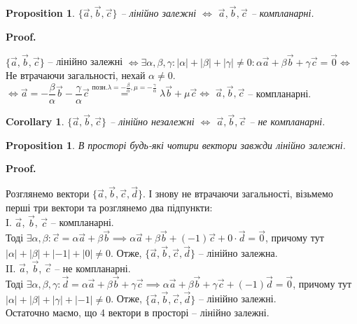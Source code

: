 \documentclass[a4paper, 10pt]{extarticle}
\makeatletter
\def\qed{$\blacksquare$}
\def\qed{$\blacksquare$}
\theoremstyle{theoremdd}
\theoremstyle{theoremdd}
\theoremstyle{theoremdd}
\theoremstyle{theoremdd}
\theoremstyle{theoremdd}
\newtheorem{proposition}[theorem]{Proposition}
\theoremstyle{theoremdd}
\theoremstyle{theoremdd}
\theoremstyle{theoremdd}
\newtheorem{corollary}[theorem]{Corollary}
\renewenvironment{proof}[1][Proof.\\]{\par
\pushQED{\hfill \qed}%
\normalfont \topsep6\p@\@plus6\p@\relax
\trivlist
\item\relax
{\bfseries
#1\@addpunct{.}}\hspace\labelsep\ignorespaces
}{%
\popQED\endtrivlist\@endpefalse
}
\makeatother
\begin{document}
\begin{proposition}
$\{\vec{a},\vec{b},\vec{c} \}$ -- лінійно залежні $\iff$ $\vec{a},\vec{b},\vec{c}$ -- компланарні.
\end{proposition}

\begin{proof}
	$\{\vec{a},\vec{b},\vec{c}\}$ -- лінійно залежні $\iff \exists \alpha, \beta, \gamma: |\alpha| + |\beta| + |\gamma| \neq 0: \alpha \vec{a} + \beta \vec{b} + \gamma \vec{c} = \vec{0} \boxed{\iff}$\\
	Не втрачаючи загальності, нехай $\alpha \neq 0$.\\
$\boxed{\iff} \vec{a} = -\dfrac{\beta}{\alpha} \vec{b} - \dfrac{\gamma}{\alpha} \vec{c} \overset{\textrm{позн.} \lambda = -\frac{\beta}{\alpha}, \mu = -\frac{\gamma}{\alpha}}{=} \lambda \vec{b} + \mu \vec{c} \iff$ $\vec{a},\vec{b},\vec{c}$ -- компланарні.
\end{proof}

\begin{corollary}
	$\{\vec{a},\vec{b},\vec{c}\}$ -- лінійно незалежні $\iff$ $\vec{a},\vec{b},\vec{c}$ -- не компланарні.
\end{corollary}

\begin{proposition}
	В просторі будь-які чотири вектори завжди лінійно залежні.
\end{proposition}

\begin{proof}
	Розглянемо вектори $\{\vec{a},\vec{b},\vec{c},\vec{d}\}$. І знову не втрачаючи загальності, візьмемо перші три вектори та розглянемо два підпункти:\\
	I. $\vec{a}$, $\vec{b}$, $\vec{c}$ -- компланарні.\\
	Тоді $\exists \alpha, \beta: \vec{c} = \alpha \vec{a} + \beta \vec{b} \implies \alpha \vec{a} + \beta \vec{b} + (-1)\vec{c} + 0 \cdot \vec{d} = \vec{0}$, причому тут $|\alpha| + |\beta| + |-1| + |0| \neq 0$. Отже, $\{\vec{a}, \vec{b}, \vec{c}, \vec{d}\}$ -- лінійно залежна.
	\bigskip \\
	II. $\vec{a}$, $\vec{b}$, $\vec{c}$ -- не компланарні.\\
	Тоді $\exists \alpha, \beta, \gamma: \vec{d} = \alpha \vec{a} + \beta \vec{b} + \gamma \vec{c} \implies \alpha \vec{a} + \beta \vec{b} + \gamma \vec{c} + (-1)\vec{d} = \vec{0}$, причому тут $|\alpha| + |\beta| + |\gamma| + |-1| \neq 0$. Отже, $\{\vec{a}, \vec{b}, \vec{c}, \vec{d}\}$ -- лінійно залежні.\\
	Остаточно маємо, що 4 вектори в просторі -- лінійно залежні.
\end{proof}
\end{document}
